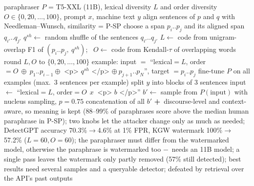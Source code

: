\documentclass[10pt,a4paper,twocolumn]{article}
\newcommand{\pro}[1]{\Statex\textcolor{proc}{\textbf{+}\ #1}}
\newcommand{\con}[1]{\Statex\textcolor{conc}{\textbf{$-$}\ #1}}
\begin{document}
\begin{algorithm}[H]\small
\caption{DIPPER paraphrase attack (Krishna et al.\ 2023)}
\begin{algorithmic}[1]
\Require paraphraser $P$ = T5-XXL (11B), lexical diversity $L$ and order diversity $O\in\{0,20,\dots,100\}$, prompt $x$, machine text $y$
 
 \State align sentences of $p$ and $q$ with Needleman--Wunsch, similarity = P-SP 
 \State choose a span $p_i..p_j$ and its aligned span $q_{i'}..q_{j'}$
 \State $q^{sh}\gets$ random shuffle of the sentences $q_{i'}..q_{j'}$
 \State $L\gets$ code from unigram-overlap F1 of $(p_i..p_j,\ q^{sh})$; \ $O\gets$ code from Kendall-$\tau$ of overlapping words
 \State round $L,O$ to $\{0,20,\dots,100\}$ 
 \State example: input $=$ ``lexical$=L$, order$=O\ \oplus\ p_1..p_{i-1}\oplus$ <p> $q^{sh}$ </p> $\oplus\ p_{j+1}..p_N$'', target $=p_i..p_j$
 \State fine-tune $P$ on all examples (max.\ 3 sentences per example)
\EndProcedure
{}
 \State split $y$ into blocks of 3 sentences
  \State input $\gets$ ``lexical$=L$, order$=O\ \ x\ $ <p> $b$ </p>'' 
  \State $b'\gets$ sample from $P(\text{input})$ with nucleus sampling, $p=0.75$
 \EndFor
 \State \Return concatenation of all $b'$
\EndProcedure
\pro{discourse-level and context-aware, so meaning is kept (88--99\% of paraphrases score above the median human paraphrase in P-SP); two knobs let the attacker change only as much as needed; DetectGPT accuracy 70.3\%$\to$4.6\% at 1\% FPR, KGW watermark 100\%$\to$57.2\% ($L{=}60,O{=}60$); the paraphraser must differ from the watermarked model, otherwise the paraphrase is watermarked too}
\con{needs an 11B model; a single pass leaves the watermark only partly removed (57\% still detected); best results need several samples and a queryable detector; defeated by retrieval over the API's past outputs}
\end{algorithmic}
\end{algorithm}
\end{document}
